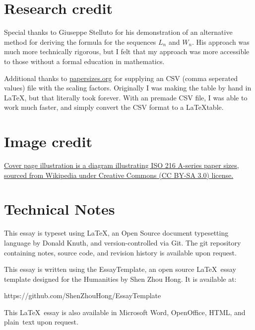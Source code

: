 
\section*{Research credit}
Special thanks to Giuseppe Stelluto for his demonstration of an alternative method for deriving the formula for the sequences $L_n$ and $W_n$. His approach was much more technically rigorous, but I felt that my approach was more accessible to those without a formal education in mathematics.

Additional thanks to \href{https://www.papersizes.org}{papersizes.org} for supplying an CSV (comma seperated values) file with the scaling factors. Originally I was making the table by hand in LaTeX, but that literally took forever. With an premade CSV file, I was able to work much faster, and simply convert the CSV format to a \LaTeX table. 

\section*{Image credit}
\href{https://en.wikipedia.org/wiki/File:A_size_illustration2.svg}{Cover page illustration is a diagram illustrating ISO 216 A-series paper sizes, sourced from Wikipedia under Creative Commons (CC BY-SA 3.0) license.}

\section*{Technical Notes}
This essay is typeset using \LaTeX, an Open Source document typesetting language
by Donald Knuth, and version-controlled via Git. The git repository containing notes, source code, and revision history is available upon request.


\noindent
This essay is written using the EssayTemplate, an open source \LaTeX\ essay
template designed for the Humanities by Shen Zhou Hong. It is available at:

https://github.com/ShenZhouHong/EssayTemplate

\vfill
\begin{center}
This \LaTeX\ essay is also available in Microsoft Word, OpenOffice, HTML, and \mbox{plain text} upon request.
\end{center}
